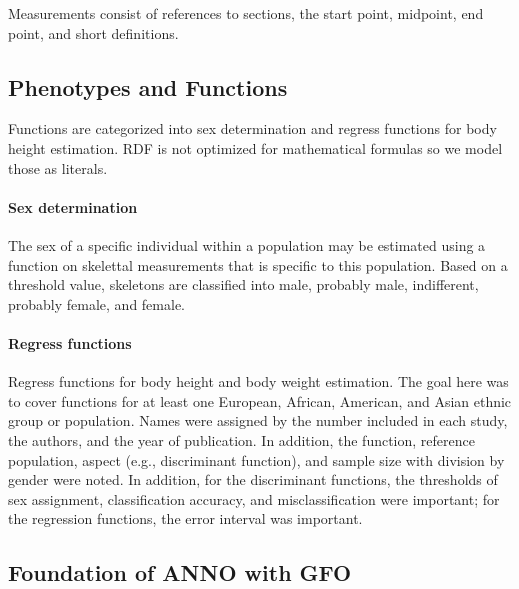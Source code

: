\documentclass[sw]{iosart2x}
\begin{document}
Measurements consist of references to sections, the start point, midpoint, end point, and short definitions.

\subsection{Phenotypes and Functions}
Functions are categorized into sex determination and regress functions for body height estimation.
RDF is not optimized for mathematical formulas so we model those as literals.

\paragraph{Sex determination}
The sex of a specific individual within a population may be estimated using a function on skelettal measurements that is specific to this population.
Based on a threshold value, skeletons are classified into male, probably male, indifferent, probably female, and female.

\paragraph{Regress functions}
Regress functions for body height and body weight estimation.
The goal here was to cover functions for at least one European, African, American, and Asian ethnic group or population.
Names were assigned by the number included in each study, the authors, and the year of publication.
In addition, the function, reference population, aspect (e.g., discriminant function), and sample size with division by gender were noted.
In addition, for the discriminant functions, the thresholds of sex assignment, classification accuracy, and misclassification were important; for the regression functions, the error interval was important.


\subsection{Foundation of ANNO with GFO}
\end{document}
